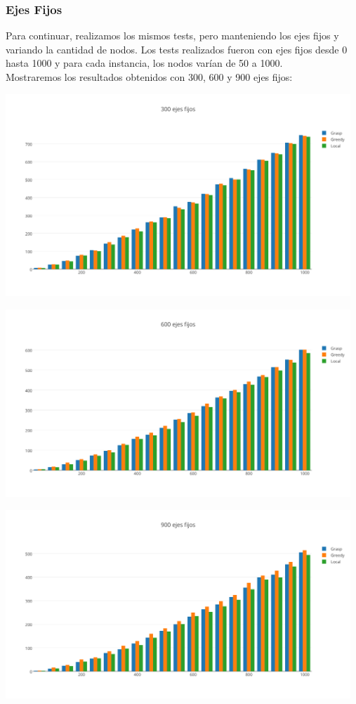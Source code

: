 \subsubsection{Ejes Fijos}
Para continuar, realizamos los mismos tests, pero manteniendo los ejes fijos y variando la cantidad de nodos. Los tests realizados fueron con ejes fijos desde 0 hasta 1000 y para cada instancia,
los nodos var\'ian de 50 a 1000.\\

Mostraremos los resultados obtenidos con 300, 600 y 900 ejes fijos:\\

   \begin{center}
 	\includegraphics[width=13cm, keepaspectratio=yes]{imagenes/6/300EjesFijos.png}

 	\includegraphics[width=13cm, keepaspectratio=yes]{imagenes/6/600EjesFijos.png}

 	\includegraphics[width=13cm, keepaspectratio=yes]{imagenes/6/900EjesFijos.png}
   \end{center}
 
